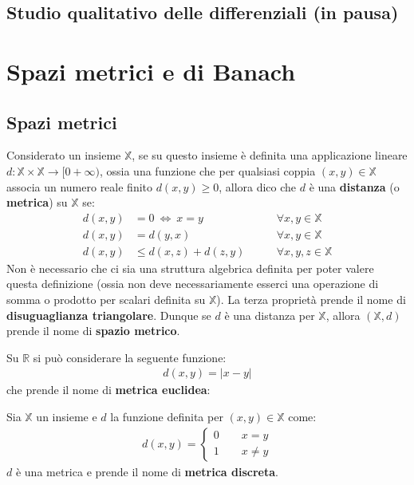 \documentclass[a4paper, oneside]{book}
\begin{document}
\section{Studio qualitativo delle differenziali (in pausa)}



\chapter{Spazi metrici e di Banach}
\section{Spazi metrici}
\begin{definition}
    Considerato un insieme $\mathbb{X}$, se su questo insieme è definita una
applicazione lineare $d : \mathbb{X} \times \mathbb{X} \to [0 + \infty )$, ossia una funzione 
che per qualsiasi coppia $(x, y) \in \mathbb{X}$ associa un numero reale finito $d(x, y) \geq 0$,
allora dico che $d$ è una \textbf{distanza} (o \textbf{metrica}) su $\mathbb{X}$ se:
\begin{align}
    d(x, y) &= 0 \ \Longleftrightarrow \ x = y \qquad &\forall x, y \in \mathbb{X}\\
    d(x, y) &= d(y, x)  \qquad &\forall x, y \in \mathbb{X}\\
    d(x, y) &\leq d(x, z) + d(z, y) \qquad &\forall x, y, z \in \mathbb{X}
\end{align}
Non è necessario che ci sia una struttura algebrica
definita per poter valere questa definizione (ossia non deve necessariamente esserci
una operazione di somma o prodotto per scalari definita su $\mathbb{X}$).
La terza proprietà prende il nome di \textbf{disuguaglianza triangolare}. Dunque se $d$ è
una distanza per $\mathbb{X}$, allora $(\mathbb{X}, d)$ prende il nome di \textbf{spazio metrico}.
\end{definition}

\begin{example} 
    Su $\mathbb{R}$ si può considerare la seguente funzione:
    \begin{gather*}
        d(x, y) = |x - y| 
    \end{gather*} 
    che prende il nome di \textbf{metrica euclidea}:
\end{example} 

\begin{example}
    Sia $\mathbb{X}$ un insieme e $d$ la funzione definita per $(x, y) \in \mathbb{X}$ come:
    \begin{gather*}
        d(x, y) = \left\{\begin{array}{l}
            0 \qquad x = y \\
            1 \qquad x \neq y
        \end{array}\right.
    \end{gather*} 
    $d$ è una metrica e prende il nome di \textbf{metrica discreta}.
\end{example}
\end{document}
